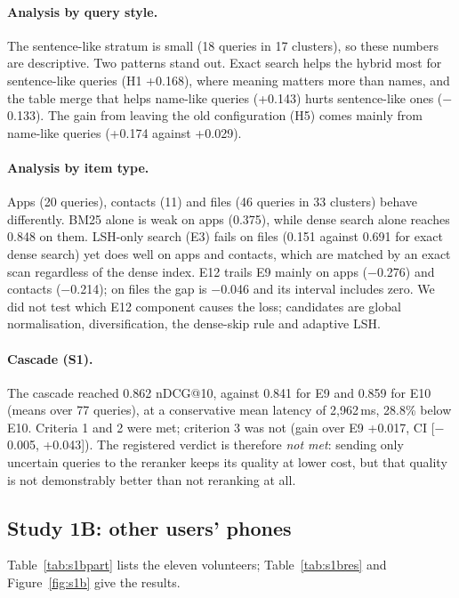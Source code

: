 \documentclass[11pt,a4paper]{article}
\makeatletter
\newcommand{\ndcg}{nDCG@10}
\makeatother
\begin{document}
\paragraph{Analysis by query style.} The sentence-like stratum is small (18 queries in 17 clusters), so these numbers are descriptive. Two patterns stand out. Exact search helps the hybrid most for sentence-like queries (H1 +0.168), where meaning matters more than names, and the table merge that helps name-like queries (+0.143) hurts sentence-like ones ($-$0.133). The gain from leaving the old configuration (H5) comes mainly from name-like queries (+0.174 against +0.029).

\paragraph{Analysis by item type.} Apps (20 queries), contacts (11) and files (46 queries in 33 clusters) behave differently. BM25 alone is weak on apps (0.375), while dense search alone reaches 0.848 on them. LSH-only search (E3) fails on files (0.151 against 0.691 for exact dense search) yet does well on apps and contacts, which are matched by an exact scan regardless of the dense index. E12 trails E9 mainly on apps ($-$0.276) and contacts ($-$0.214); on files the gap is $-$0.046 and its interval includes zero. We did not test which E12 component causes the loss; candidates are global normalisation, diversification, the dense-skip rule and adaptive LSH.

\paragraph{Cascade (S1).} The cascade reached 0.862 \ndcg{}, against 0.841 for E9 and 0.859 for E10 (means over 77 queries), at a conservative mean latency of 2,962\,ms, 28.8\% below E10. Criteria 1 and 2 were met; criterion 3 was not (gain over E9 +0.017, CI [$-$0.005, +0.043]). The registered verdict is therefore \emph{not met}: sending only uncertain queries to the reranker keeps its quality at lower cost, but that quality is not demonstrably better than not reranking at all.

\subsection{Study 1B: other users' phones}\label{sec:s1bres}

Table~\ref{tab:s1bpart} lists the eleven volunteers; Table~\ref{tab:s1bres} and Figure~\ref{fig:s1b} give the results.
\end{document}
